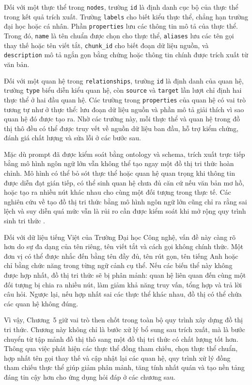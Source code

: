 Đối với một thực thể trong \texttt{nodes}, trường \texttt{id} là định danh cục bộ của thực thể trong kết quả trích xuất. Trường \texttt{labels} cho biết kiểu thực thể, chẳng hạn trường đại học hoặc cá nhân. Phần \texttt{properties} lưu các thông tin mô tả của thực thể. Trong đó, \texttt{name} là tên chuẩn được chọn cho thực thể, \texttt{aliases} lưu các tên gọi thay thế hoặc tên viết tắt, \texttt{chunk\_id} cho biết đoạn dữ liệu nguồn, và \texttt{description} mô tả ngắn gọn bằng chứng hoặc thông tin chính được trích xuất từ văn bản.

Đối với một quan hệ trong \texttt{relationships}, trường \texttt{id} là định danh của quan hệ, trường \texttt{type} biểu diễn kiểu quan hệ, còn \texttt{source} và \texttt{target} lần lượt chỉ định hai thực thể ở hai đầu quan hệ. Các trường trong \texttt{properties} của quan hệ có vai trò tương tự như ở thực thể: lưu đoạn dữ liệu nguồn và phần mô tả giải thích vì sao quan hệ đó được tạo ra. Nhờ các trường này, mỗi thực thể và quan hệ trong đồ thị thô đều có thể được truy vết về nguồn dữ liệu ban đầu, hỗ trợ kiểm chứng, đánh giá chất lượng và sửa lỗi ở các bước sau.

Mặc dù prompt đã được kiểm soát bằng ontology và schema, trích xuất trực tiếp bằng mô hình ngôn ngữ lớn vẫn không thể tạo ngay một đồ thị tri thức hoàn chỉnh. Mô hình có thể bỏ sót thực thể hoặc quan hệ quan trọng khi thông tin được diễn đạt gián tiếp, có thể sinh quan hệ chưa đủ căn cứ nếu văn bản mơ hồ, hoặc tạo ra nhiều nút khác nhau cho cùng một đối tượng trong thực tế. Các nghiên cứu về tạo đồ thị tri thức bằng mô hình ngôn ngữ lớn cũng chỉ ra rằng sai lệch và suy diễn quá mức vẫn là rủi ro cần được kiểm soát khi mở rộng quy trình sinh tri thức \cite{parovic2025generating}.

Đối với dữ liệu tiếng Việt của Trường Đại học Công nghệ, vấn đề này càng rõ hơn do sự đa dạng của tên riêng, tên viết tắt và cách gọi không chính thức. Một đơn vị có thể được nhắc đến bằng tên đầy đủ, tên rút gọn, tên tiếng Anh hoặc chỉ bằng chức năng trong từng ngữ cảnh cụ thể. Nếu các biến thể này không được hợp nhất, đồ thị tri thức sẽ bị phân mảnh: quan hệ liên quan đến cùng một đối tượng bị chia ra nhiều nút, làm giảm khả năng truy vấn, tổng hợp và trả lời câu hỏi. Ngược lại, nếu hợp nhất sai các thực thể khác nhau, đồ thị có thể chứa các quan hệ không đúng.

Vì vậy, Chương~5 giữ vai trò then chốt trong toàn bộ quy trình xây dựng đồ thị tri thức. Chương này không chỉ là bước xử lý bổ sung sau trích xuất, mà là bước chuyển từ tập mảnh đồ thị thô sang một đồ thị tri thức có chất lượng tốt hơn. Thông qua việc phát hiện các thực thể đồng tham chiếu, chọn thực thể chuẩn, hợp nhất tên gọi thay thế và cập nhật lại các quan hệ, quy trình xử lý đồng tham chiếu thực thể giúp giảm phân mảnh, tăng tính nhất quán và tạo nền tảng đáng tin cậy hơn cho ứng dụng hỏi đáp ở các chương sau.
